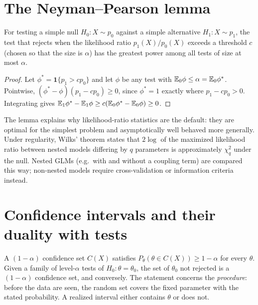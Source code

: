 \section{The Neyman--Pearson lemma}
\begin{theorem}
For testing a simple null $H_0:X\sim p_0$ against a simple alternative $H_1:X\sim p_1$, the test that rejects when the likelihood ratio $p_1(X)/p_0(X)$ exceeds a threshold $c$ (chosen so that the size is $\alpha$) has the greatest power among all tests of size at most $\alpha$.
\end{theorem}
\begin{proof}
Let $\phi^\ast=\mathbf 1\{p_1>cp_0\}$ and let $\phi$ be any test with $\mathbb E_0\phi\le\alpha=\mathbb E_0\phi^\ast$. Pointwise, $(\phi^\ast-\phi)(p_1-cp_0)\ge0$, since $\phi^\ast=1$ exactly where $p_1-cp_0>0$. Integrating gives $\mathbb E_1\phi^\ast-\mathbb E_1\phi\ge c(\mathbb E_0\phi^\ast-\mathbb E_0\phi)\ge0$.
\end{proof}
The lemma explains why likelihood-ratio statistics are the default: they are optimal for the simplest problem and asymptotically well behaved more generally. Under regularity, Wilks' theorem states that $2\log$ of the maximized likelihood ratio between nested models differing by $q$ parameters is approximately $\chi^2_q$ under the null. Nested GLMs (e.g.\ with and without a coupling term) are compared this way; non-nested models require cross-validation or information criteria instead.

\section{Confidence intervals and their duality with tests}
A $(1-\alpha)$ confidence set $C(X)$ satisfies $P_\theta(\theta\in C(X))\ge1-\alpha$ for every $\theta$. Given a family of level-$\alpha$ tests of $H_0:\theta=\theta_0$, the set of $\theta_0$ not rejected is a $(1-\alpha)$ confidence set, and conversely. The statement concerns the \emph{procedure}: before the data are seen, the random set covers the fixed parameter with the stated probability. A realized interval either contains $\theta$ or does not.

